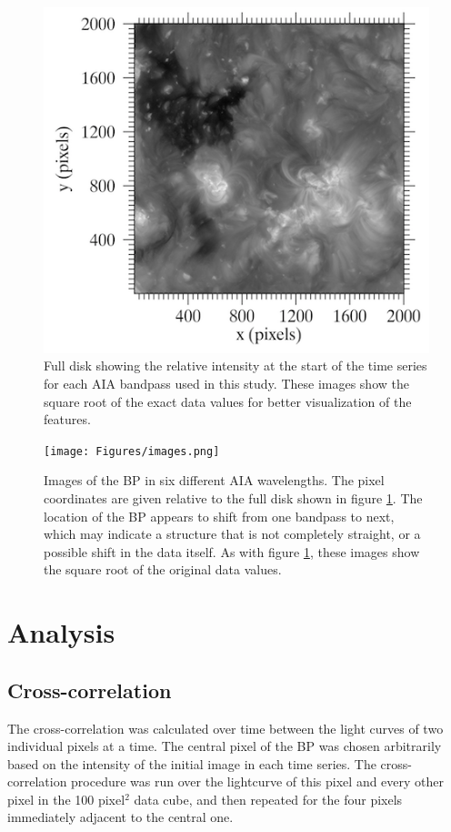 \documentclass[preprint2]{aastex}
\begin{document}
\begin{figure}[htb!]
    \includegraphics[width=\textwidth]{Figures/full.png}
    \caption{Full disk showing the relative intensity at the start of the time
        series for each AIA bandpass used in this study. These images show the
        square root of the exact data values for better visualization of the features. }
    \label{full}
\end{figure}

\begin{figure}[htb!]
    \texttt{[image: Figures/images.png]}
    \caption{Images of the BP in six different AIA wavelengths. The pixel coordinates
        are given relative to the full disk shown in figure \ref{full}. The
        location of the BP appears to shift from one bandpass to next, which
        may indicate a structure that is not completely straight, or a possible
        shift in the data itself. As with figure \ref{full}, these images show
        the square root of the original data values.}
    \label{bp_images}
\end{figure}



\section{Analysis}\label{analysis}
\subsection{Cross-correlation}\label{cc_analysis}
The cross-correlation was calculated over time between the light curves of two
individual pixels at a time. The central pixel of the BP was chosen arbitrarily based on
the intensity of the initial image in each time series. The cross-correlation procedure was
run over the lightcurve of this pixel and every other pixel in the 100 pixel$^{2}$ data
cube, and then repeated for
the four pixels immediately adjacent to the central one.
\end{document}
